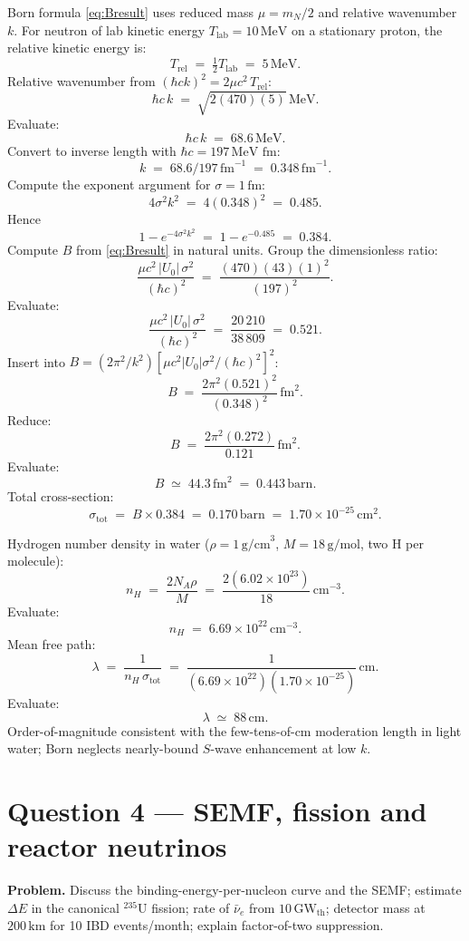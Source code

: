 \documentclass[11pt]{article}
\begin{document}
Born formula \eqref{eq:Bresult} uses reduced mass $\mu=m_{N}/2$ and relative wavenumber $k$. For neutron of lab kinetic energy $T_{\text{lab}}=10\,\text{MeV}$ on a stationary proton, the relative kinetic energy is:
\[
T_{\text{rel}}\;=\;\tfrac{1}{2}T_{\text{lab}}\;=\;5\,\text{MeV}.
\]
Relative wavenumber from $(\hbar c k)^{2}=2\mu c^{2}\,T_{\text{rel}}$:
\[
\hbar c\,k\;=\;\sqrt{2(470)(5)}\,\text{MeV}.
\]
Evaluate:
\[
\hbar c\,k\;=\;68.6\,\text{MeV}.
\]
Convert to inverse length with $\hbar c=197\,\text{MeV fm}$:
\[
k\;=\;68.6/197\,\text{fm}^{-1}\;=\;0.348\,\text{fm}^{-1}.
\]
Compute the exponent argument for $\sigma=1\,\text{fm}$:
\[
4\sigma^{2}k^{2}\;=\;4(0.348)^{2}\;=\;0.485.
\]
Hence
\[
1-e^{-4\sigma^{2}k^{2}}\;=\;1-e^{-0.485}\;=\;0.384.
\]
Compute $B$ from \eqref{eq:Bresult} in natural units. Group the dimensionless ratio:
\[
\frac{\mu c^{2}\,|U_{0}|\,\sigma^{2}}{(\hbar c)^{2}}\;=\;\frac{(470)(43)(1)^{2}}{(197)^{2}}.
\]
Evaluate:
\[
\frac{\mu c^{2}\,|U_{0}|\,\sigma^{2}}{(\hbar c)^{2}}\;=\;\frac{20\,210}{38\,809}\;=\;0.521.
\]
Insert into $B=(2\pi^{2}/k^{2})[\mu c^{2}|U_{0}|\sigma^{2}/(\hbar c)^{2}]^{2}$:
\[
B\;=\;\frac{2\pi^{2}(0.521)^{2}}{(0.348)^{2}}\,\text{fm}^{2}.
\]
Reduce:
\[
B\;=\;\frac{2\pi^{2}(0.272)}{0.121}\,\text{fm}^{2}.
\]
Evaluate:
\[
B\;\simeq\;44.3\,\text{fm}^{2}\;=\;0.443\,\text{barn}.
\]
Total cross-section:
\[
\sigma_\text{tot}\;=\;B\times 0.384\;=\;0.170\,\text{barn}\;=\;1.70\times 10^{-25}\,\text{cm}^{2}.
\]

Hydrogen number density in water ($\rho=1\,\text{g/cm}^{3}$, $M=18\,\text{g/mol}$, two H per molecule):
\[
n_{H}\;=\;\frac{2N_{A}\rho}{M}\;=\;\frac{2(6.02\times 10^{23})}{18}\,\text{cm}^{-3}.
\]
Evaluate:
\[
n_{H}\;=\;6.69\times 10^{22}\,\text{cm}^{-3}.
\]
Mean free path:
\[
\lambda\;=\;\frac{1}{n_{H}\,\sigma_\text{tot}}\;=\;\frac{1}{(6.69\times 10^{22})(1.70\times 10^{-25})}\,\text{cm}.
\]
Evaluate:
\begin{equation}
\boxed{\;\lambda\;\simeq\;88\,\text{cm}.\;}
\end{equation}
Order-of-magnitude consistent with the few-tens-of-cm moderation length in light water; Born neglects nearly-bound $S$-wave enhancement at low $k$.

\section*{Question 4 --- SEMF, fission and reactor neutrinos}

\textbf{Problem.} Discuss the binding-energy-per-nucleon curve and the SEMF; estimate $\Delta E$ in the canonical $^{235}$U fission; rate of $\bar\nu_{e}$ from $10\,\text{GW}_\text{th}$; detector mass at $200\,\text{km}$ for 10 IBD events/month; explain factor-of-two suppression.
\end{document}
